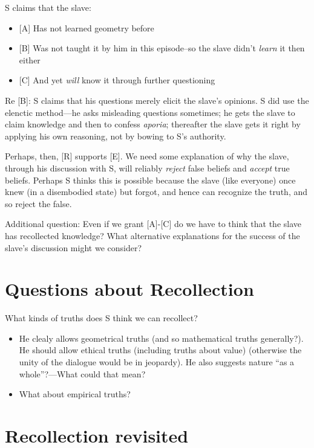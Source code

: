 \documentclass[10 pt]{article}
\begin{document}
\noindent S claims that the slave:
\begin{itemize}\item{[A] Has not learned geometry before}\item{[B] Was not taught it by him in this episode--so the slave didn't \emph{learn} it then either}\item{[C] And yet \emph{will} know it through further questioning}\end{itemize}

\noindent Re [B]: S claims that his questions merely elicit the slave's opinions. S did use the elenctic method---he asks misleading questions sometimes; he gets the slave to claim knowledge and then to confess \emph{aporia}; thereafter the slave gets it right by applying his own reasoning, not by bowing to S's authority.
\vspace*{2mm}

\noindent Perhaps, then, [R] supports [E]. We need some explanation of why the slave, through his discussion with S, will reliably \emph{reject} false beliefs and \emph{accept} true beliefs. Perhaps S thinks this is possible because the slave (like everyone) once knew (in a disembodied state) but forgot, and hence can recognize the truth, and so reject the false.
\vspace*{2mm}

\noindent Additional question: Even if we grant [A]-[C] do we have to think that the slave has recollected knowledge? What alternative explanations for the success of the slave's discussion might we consider?

\section*{Questions about Recollection}

 What kinds of truths does S think we can recollect?

\begin{itemize}\item{He clealy allows geometrical truths (and so mathematical truths generally?). He should allow ethical truths (including truths about value) (otherwise the unity of the dialogue would be in jeopardy). He also suggests nature ``as a whole''?---What could that mean?}\item{What about empirical truths?}\end{itemize}

\section*{Recollection revisited}
\end{document}
